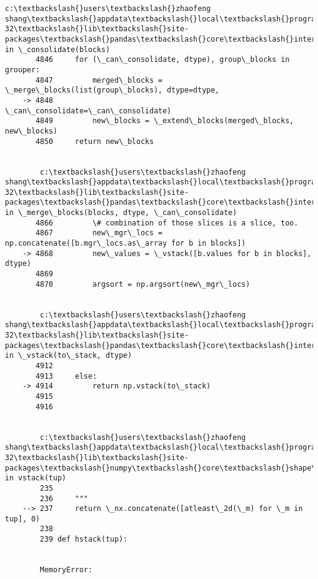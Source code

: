 \documentclass[11pt]{article}
\begin{document}
\begin{Verbatim}[commandchars=\\\{\}]
        c:\textbackslash{}users\textbackslash{}zhaofeng shang\textbackslash{}appdata\textbackslash{}local\textbackslash{}programs\textbackslash{}python\textbackslash{}python36-32\textbackslash{}lib\textbackslash{}site-packages\textbackslash{}pandas\textbackslash{}core\textbackslash{}internals.py in \_consolidate(blocks)
       4846     for (\_can\_consolidate, dtype), group\_blocks in grouper:
       4847         merged\_blocks = \_merge\_blocks(list(group\_blocks), dtype=dtype,
    -> 4848                                       \_can\_consolidate=\_can\_consolidate)
       4849         new\_blocks = \_extend\_blocks(merged\_blocks, new\_blocks)
       4850     return new\_blocks
    

        c:\textbackslash{}users\textbackslash{}zhaofeng shang\textbackslash{}appdata\textbackslash{}local\textbackslash{}programs\textbackslash{}python\textbackslash{}python36-32\textbackslash{}lib\textbackslash{}site-packages\textbackslash{}pandas\textbackslash{}core\textbackslash{}internals.py in \_merge\_blocks(blocks, dtype, \_can\_consolidate)
       4866         \# combination of those slices is a slice, too.
       4867         new\_mgr\_locs = np.concatenate([b.mgr\_locs.as\_array for b in blocks])
    -> 4868         new\_values = \_vstack([b.values for b in blocks], dtype)
       4869 
       4870         argsort = np.argsort(new\_mgr\_locs)
    

        c:\textbackslash{}users\textbackslash{}zhaofeng shang\textbackslash{}appdata\textbackslash{}local\textbackslash{}programs\textbackslash{}python\textbackslash{}python36-32\textbackslash{}lib\textbackslash{}site-packages\textbackslash{}pandas\textbackslash{}core\textbackslash{}internals.py in \_vstack(to\_stack, dtype)
       4912 
       4913     else:
    -> 4914         return np.vstack(to\_stack)
       4915 
       4916 
    

        c:\textbackslash{}users\textbackslash{}zhaofeng shang\textbackslash{}appdata\textbackslash{}local\textbackslash{}programs\textbackslash{}python\textbackslash{}python36-32\textbackslash{}lib\textbackslash{}site-packages\textbackslash{}numpy\textbackslash{}core\textbackslash{}shape\_base.py in vstack(tup)
        235 
        236     """
    --> 237     return \_nx.concatenate([atleast\_2d(\_m) for \_m in tup], 0)
        238 
        239 def hstack(tup):
    

        MemoryError: 

    \end{Verbatim}


    
    
    
    
\end{document}
